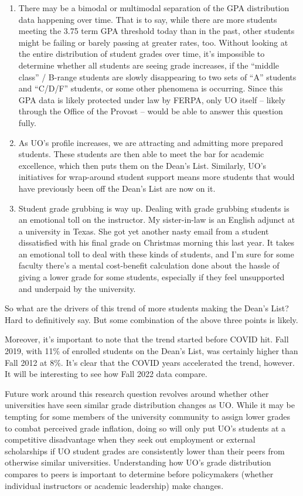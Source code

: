 \documentclass[10pt]{article}
\begin{document}
\begin{enumerate}
	\item There may be a bimodal or multimodal separation of the GPA distribution data happening over time. That is to say, while there are more students meeting the 3.75 term GPA threshold today than in the past, other students might be failing or barely passing at greater rates, too. Without looking at the entire distribution of student grades over time, it's impossible to determine whether all students are seeing grade increases, if the ``middle class'' / B-range students are slowly disappearing to two sets of ``A'' students and ``C/D/F'' students, or some other phenomena is occurring. Since this GPA data is likely protected under law by FERPA, only UO itself -- likely through the Office of the Provost -- would be able to answer this question fully.
	\item As UO's profile increases, we are attracting and admitting more prepared students. These students are then able to meet the bar for academic excellence, which then puts them on the Dean's List. Similarly, UO's initiatives for wrap-around student support means more students that would have previously been off the Dean's List are now on it.
	\item Student grade grubbing is way up. Dealing with grade grubbing students is an emotional toll on the instructor. My sister-in-law is an English adjunct at a university in Texas. She got yet another nasty email from a student dissatisfied with his final grade on Christmas morning this last year. It takes an emotional toll to deal with these kinds of students, and I'm sure for some faculty there's a mental cost-benefit calculation done about the hassle of giving a lower grade for some students, especially if they feel unsupported and underpaid by the university.
\end{enumerate}

So what are the drivers of this trend of more students making the Dean's List? Hard to definitively say. But some combination of the above three points is likely.

Moreover, it's important to note that the trend started before COVID hit. Fall 2019, with 11\% of enrolled students on the Dean's List, was certainly higher than Fall 2012 at 8\%. It's clear that the COVID years accelerated the trend, however. It will be interesting to see how Fall 2022 data compare.

Future work around this research question revolves around whether other universities have seen similar grade distribution changes as UO. While it may be tempting for some members of the university community to assign lower grades to combat perceived grade inflation, doing so will only put UO's students at a competitive disadvantage when they seek out employment or external scholarships if UO student grades are consistently lower than their peers from otherwise similar universities. Understanding how UO's grade distribution compares to peers is important to determine before policymakers (whether individual instructors or academic leadership) make changes.
\end{document}
